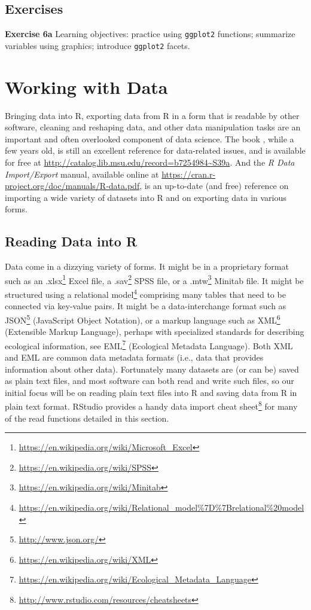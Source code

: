 \documentclass[
]{krantz}
\renewcommand{\href}[2]{#2\footnote{\url{#1}}}
\begin{document}
\hypertarget{exCh5}{%
\section{Exercises}\label{exCh5}}

\textbf{Exercise 6a} Learning objectives: practice using \texttt{ggplot2} functions; summarize variables using graphics; introduce \texttt{ggplot2} facets.

\hypertarget{data2}{%
\chapter{Working with Data}\label{data2}}

Bringing data into R, exporting data from R in a form that is readable by other software, cleaning and reshaping data, and other data manipulation tasks are an important and often overlooked component of data science. The book \citet{SpectorDataManipulation}, while a few years old, is still an excellent reference for data-related issues, and is available for free at \url{http://catalog.lib.msu.edu/record=b7254984~S39a}. And the \emph{R Data Import/Export} manual, available online at \url{https://cran.r-project.org/doc/manuals/R-data.pdf}, is an up-to-date (and free) reference on importing a wide variety of datasets into R and on exporting data in various forms.

\hypertarget{reading-data-into-r}{%
\section{Reading Data into R}\label{reading-data-into-r}}

Data come in a dizzying variety of forms. It might be in a proprietary format such as an \href{https://en.wikipedia.org/wiki/Microsoft_Excel}{.xlsx} Excel file, a \href{https://en.wikipedia.org/wiki/SPSS}{.sav} SPSS file, or a \href{https://en.wikipedia.org/wiki/Minitab}{.mtw} Minitab file. It might be structured using a \href{https://en.wikipedia.org/wiki/Relational_model\%7D\%7Brelational\%20model}{relational model} comprising many tables that need to be connected via key-value pairs. It might be a data-interchange format such as \href{http://www.json.org/}{JSON} (JavaScript Object Notation), or a markup language such as \href{https://en.wikipedia.org/wiki/XML}{XML} (Extensible Markup Language), perhaps with specialized standards for describing ecological information, see \href{https://en.wikipedia.org/wiki/Ecological_Metadata_Language}{EML} (Ecological Metadata Language). Both XML and EML are common data metadata formats (i.e., data that provides information about other data). Fortunately many datasets are (or can be) saved as plain text files, and most software can both read and write such files, so our initial focus will be on reading plain text files into R and saving data from R in plain text format. RStudio provides a handy \href{http://www.rstudio.com/resources/cheatsheets}{data import cheat sheet} for many of the read functions detailed in this section.
\end{document}
